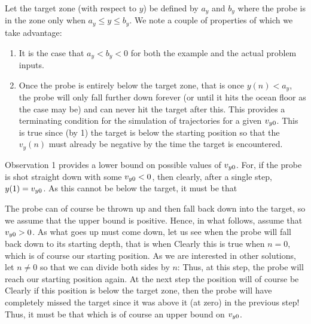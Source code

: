 \documentclass{article}
\begin{document}
{    Let the target zone (with respect to $y$) be defined by $a_y$ and $b_y$ where the probe is in the zone only when $a_y \leq y \leq b_y$.
    We note a couple of properties of which we take advantage:
    \begin{enumerate}
        \item It is the case that $a_y < b_y < 0$ for both the example and the actual problem inputs.
        \item Once the probe is entirely below the target zone, that is once $y(n) < a_y$, the probe will only fall further down forever (or until it hits the ocean floor as the case may be) and can never hit the target after this.
        This provides a terminating condition for the simulation of trajectories for a given $v_{y0}$.
        This is true since (by 1) the target is below the starting position so that the $v_y(n)$ must already be negative by the time the target is encountered.
    \end{enumerate}
    Observation 1 provides a lower bound on possible values of $v_{y0}$.
    For, if the probe is shot straight down with some $v_{y0} < 0$, then clearly, after a single step, $y(1) = v_{y0}$.
    As this cannot be below the target, it must be that
    
    The probe can of course be thrown up and then fall back down into the target, so we assume that the upper bound is positive.
    Hence, in what follows, assume that $v_{y0} > 0$.
    As what goes up must come down, let us see when the probe will fall back down to its starting depth, that is when
    Clearly this is true when $n = 0$, which is of course our starting position.
    As we are interested in other solutions, let $n \neq 0$ so that we can divide both sides by $n$:
    Thus, at this step, the probe will reach our starting position again.
    At the next step the position will of course be
    Clearly if this position is below the target zone, then the probe will have completely missed the target since it was above it (at zero) in the previous step!
    Thus, it must be that
    which is of course an upper bound on $v_{y0}$.
}
\end{document}

